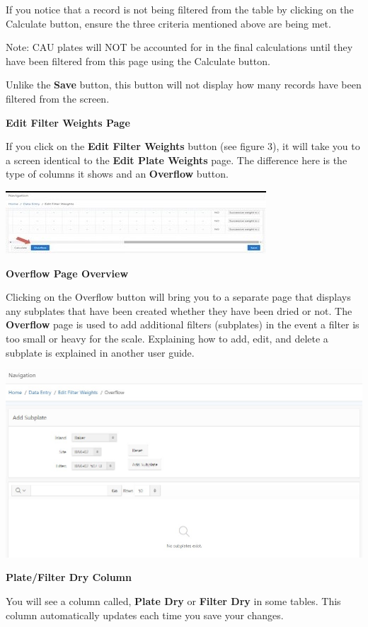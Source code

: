 \documentclass[]{book}
\begin{document}
If you notice that a record is not being filtered from the table by clicking on the Calculate button, ensure the three criteria mentioned above are being met.

Note: CAU plates will NOT be accounted for in the final calculations until they have been filtered from this page using the Calculate button.

Unlike the \textbf{Save} button, this button will not display how many records have been filtered from the screen.

\textbf{Edit Filter Weights Page}

If you click on the \textbf{Edit Filter Weights} button (see figure 3), it will take you to a screen identical to the \textbf{Edit Plate Weights} page. The difference here is the type of columns it shows and an \textbf{Overflow} button.

\includegraphics{images/Data5.jpg}

\textbf{Overflow Page Overview}

Clicking on the Overflow button will bring you to a separate page that displays any subplates that have been created whether they have been dried or not. The \textbf{Overflow} page is used to add additional filters (subplates) in the event a filter is too small or heavy for the scale. Explaining how to add, edit, and delete a subplate is explained in another user guide.

\includegraphics{images/Data6.jpg}

\textbf{Plate/Filter Dry Column}

You will see a column called, \textbf{Plate Dry} or \textbf{Filter Dry} in some tables. This column automatically updates each time you save your changes.
\end{document}
